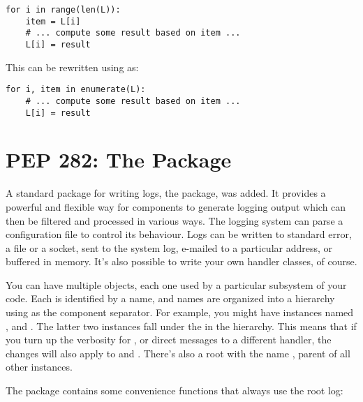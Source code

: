 \documentclass{howto}
\begin{document}
\begin{verbatim}
for i in range(len(L)):
    item = L[i]
    # ... compute some result based on item ...
    L[i] = result
\end{verbatim}

This can be rewritten using  as:

\begin{verbatim}
for i, item in enumerate(L):
    # ... compute some result based on item ...
    L[i] = result
\end{verbatim}


\begin{seealso}


\end{seealso}


\section{PEP 282: The  Package}

A standard package for writing logs, the  package, was
added.  It provides a powerful and flexible way for components to
generate logging output which can then be filtered and processed in
various ways.  The logging system can parse a configuration file to
control its behaviour.  Logs can be written to standard error, a file
or a socket, sent to the system log, e-mailed to a particular address,
or buffered in memory.  It's also possible to write your own handler
classes, of course.

You can have multiple  objects, each one used by a
particular subsystem of your code.  Each  is identified
by a name, and names are organized into a hierarchy using   as
the component separator.  For example, you might have 
instances named ,  and
.  The latter two instances fall under the
  in the hierarchy.  This means that if you 
turn up the verbosity for , or direct 
 messages to a different handler, 
the changes will also apply to  and
.
There's also a root  with the name , 
parent of all other instances.

The  package contains some convenience functions
that always use the root log:
\end{document}
